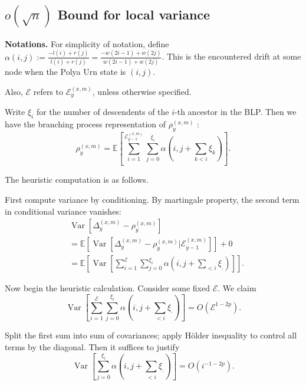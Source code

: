 


\subsection{$o(\sqrt{n}) $ Bound for local variance}

\textbf{Notations.} For simplicity of notation, define $\alpha(i,j) := \frac{- l(i) + r(j)}{l(i) + r(j)} = \frac{-w(2 i - 1) + w(2j)}{w(2i-1)+w(2j)}$. This is the encountered drift at some node when the Polya Urn state is $(i,j)$.

Also, $\mathcal{E}$ refers to $\mathcal{E}_y^{(x,m)}$, unless otherwise specified.

Write $\xi_i$ for the number of descendents of the $i$-th ancestor in the BLP. Then we have the branching process representation of $\rho_y^{(x,m)}$ :
\[
	\rho_y^{(x,m)} = \mathbb{E}\left[ \sum_{i = 1}^{\mathcal{E}_{y-1}^{(x,m)}} \sum_{j = 0}^{\xi_i} \alpha(i, j + \sum_{k < i} \xi_k) \right] 
.\] 

The heuristic computation is as follows.
 
First compute variance by conditioning. By martingale property, the second term in conditional variance vanishes:
 \begin{align*}
	  &\operatorname{Var} \left[ \Delta_y^{(x,m)} - \rho_y^{(x,m)}  \right]\\
	 &=  \mathbb{E} \left[\operatorname{Var} \left[ \Delta_y^{(x,m)} - \rho_y^{(x,m)} | \mathcal{E}_{y-1}^{(x,m) } \right]\right] + 0\\
	 &= \mathbb{E}\left[ \operatorname{Var} \left[ \sum_{i = 1}^\mathcal{E} \sum_{j = 0}^{\xi_i} \alpha(i, j + \sum_{< i} \xi_.) \right]  \right] 
.\end{align*}

Now begin the heuristic calculation. Consider some fixed $\mathcal{E}$. We claim
\[
	\operatorname{Var} \left[ \sum_{i = 1}^\mathcal{E} \sum_{j = 0}^{\xi_i} \alpha(i, j + \sum_{< i} \xi_.) \right] 
	= O(\mathcal{E}^{1 - 2 p})
.\] 

Split the first sum into sum of covariances; apply Hölder inequality to control all terms by the diagonal. Then it suffices to justify
\[
	\operatorname{Var} \left[ \sum_{j = 0}^{\xi_i} \alpha(i, j + \sum_{< i} \xi_.) \right] 
	= O\left( i^{-1-2p} \right) 
.\] 

